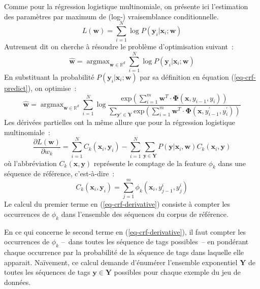 \documentclass[11pt,openany]{book}
\begin{document}
Comme pour la régression logistique multinomiale,
on présente ici l'estimation des paramètres par maximum de (log-) vraisemblance conditionnelle. 
\begin{equation}
L(\mathbf{w}) = \sum_{i=1}^N \log P(\mathbf{y}_i | \mathbf{x}_i;\mathbf{w})
\end{equation}
Autrement dit on cherche à résoudre le problème d'optimisation suivant~:
\begin{equation}
\hat{\mathbf{w}} =  \mathop{\text{argmax}}_{\mathbf{w}\in\mathbb{R}^d} \sum_{i=1}^N \log P(\mathbf{y}_i | \mathbf{x}_i;\mathbf{w})
\end{equation}
En substituant la probabilité $P(\mathbf{y}_i | \mathbf{x}_i;\mathbf{w})$ par sa définition en équation (\ref{eq-crf-predict}), on optimise~:
\begin{equation}
\hat{\mathbf{w}} =  \mathop{\text{argmax}}_{\mathbf{w}\in\mathbb{R}^d} \sum_{i=1}^N \log\frac{\text{exp}\left(\sum_{i=1}^m \mathbf{w}^T \cdot \boldsymbol\Phi(\mathbf{x},y_{i-1},y_i)\right)}
{\sum_{\mathbf{y}'\in \mathbf{Y}}
\text{exp}\left(\sum_{i=1}^m \mathbf{w}^T \cdot \boldsymbol\Phi(\mathbf{x},y^{'}_{i-1},y^{'}_i)\right)}
\end{equation}
Les dérivées partielles ont la même allure que pour la régression logistique multinomiale~:
\begin{equation}
\label{eq-crf-derivative}
\frac{\partial L(\mathbf{w})}{\partial w_k} 
= \sum_{i=1}^N C_k(\mathbf{x}_i,\mathbf{y}_i)
- \sum_{i=1}^N \sum_{\mathbf{y}\in \mathbf{Y}} P(\mathbf{y}|\mathbf{x}_i,\mathbf{w}) C_k(\mathbf{x}_i,\mathbf{y})
\end{equation}
où l'abbréviation $C_k(\mathbf{x},\mathbf{y})$
représente le comptage de la feature $\phi_k$
dans une séquence de référence, c'est-à-dire~:
\begin{displaymath}
C_k(\mathbf{x}_i,\mathbf{y}_i) = \sum_{j=1}^m \phi_k(\mathbf{x}_i,y_{j-1}^i,y_j^i)
\end{displaymath}
Le calcul du premier terme en (\ref{eq-crf-derivative}) consiste à compter les occurrences de $\phi_k$ dans l'ensemble des séquences du corpus de référence.

En ce qui concerne le second terme en (\ref{eq-crf-derivative}), il faut compter les occurrences de $\phi_k$ 
--~dans toutes les séquence de tags possibles~-- en pondérant chaque occurrence par la probabilité de la séquence de tags dans laquelle elle apparait. 
Naïvement, ce calcul demande d'énumérer
l'ensemble exponentiel $\mathbf{Y}$ 
de toutes les séquences de tags $\mathbf{y}\in\mathbf{Y}$ possibles pour chaque exemple du jeu de données.
\end{document}
